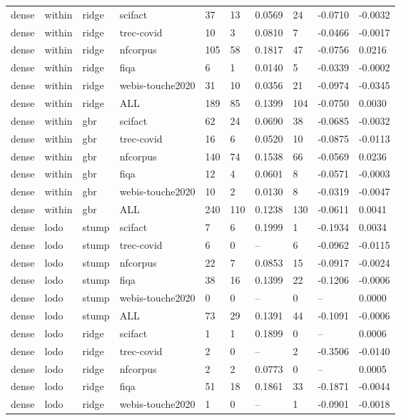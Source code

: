 \begin{table}[t]
\begin{tabular}{llllllllll}
dense & within & ridge & scifact & 37 & 13 & 0.0569 & 24 & -0.0710 & -0.0032 \\
dense & within & ridge & trec-covid & 10 & 3 & 0.0810 & 7 & -0.0466 & -0.0017 \\
dense & within & ridge & nfcorpus & 105 & 58 & 0.1817 & 47 & -0.0756 & 0.0216 \\
dense & within & ridge & fiqa & 6 & 1 & 0.0140 & 5 & -0.0339 & -0.0002 \\
dense & within & ridge & webis-touche2020 & 31 & 10 & 0.0356 & 21 & -0.0974 & -0.0345 \\
dense & within & ridge & ALL & 189 & 85 & 0.1399 & 104 & -0.0750 & 0.0030 \\
dense & within & gbr & scifact & 62 & 24 & 0.0690 & 38 & -0.0685 & -0.0032 \\
dense & within & gbr & trec-covid & 16 & 6 & 0.0520 & 10 & -0.0875 & -0.0113 \\
dense & within & gbr & nfcorpus & 140 & 74 & 0.1538 & 66 & -0.0569 & 0.0236 \\
dense & within & gbr & fiqa & 12 & 4 & 0.0601 & 8 & -0.0571 & -0.0003 \\
dense & within & gbr & webis-touche2020 & 10 & 2 & 0.0130 & 8 & -0.0319 & -0.0047 \\
dense & within & gbr & ALL & 240 & 110 & 0.1238 & 130 & -0.0611 & 0.0041 \\
dense & lodo & stump & scifact & 7 & 6 & 0.1999 & 1 & -0.1934 & 0.0034 \\
dense & lodo & stump & trec-covid & 6 & 0 & -- & 6 & -0.0962 & -0.0115 \\
dense & lodo & stump & nfcorpus & 22 & 7 & 0.0853 & 15 & -0.0917 & -0.0024 \\
dense & lodo & stump & fiqa & 38 & 16 & 0.1399 & 22 & -0.1206 & -0.0006 \\
dense & lodo & stump & webis-touche2020 & 0 & 0 & -- & 0 & -- & 0.0000 \\
dense & lodo & stump & ALL & 73 & 29 & 0.1391 & 44 & -0.1091 & -0.0006 \\
dense & lodo & ridge & scifact & 1 & 1 & 0.1899 & 0 & -- & 0.0006 \\
dense & lodo & ridge & trec-covid & 2 & 0 & -- & 2 & -0.3506 & -0.0140 \\
dense & lodo & ridge & nfcorpus & 2 & 2 & 0.0773 & 0 & -- & 0.0005 \\
dense & lodo & ridge & fiqa & 51 & 18 & 0.1861 & 33 & -0.1871 & -0.0044 \\
dense & lodo & ridge & webis-touche2020 & 1 & 0 & -- & 1 & -0.0901 & -0.0018 \\

\end{tabular}
\end{table}
